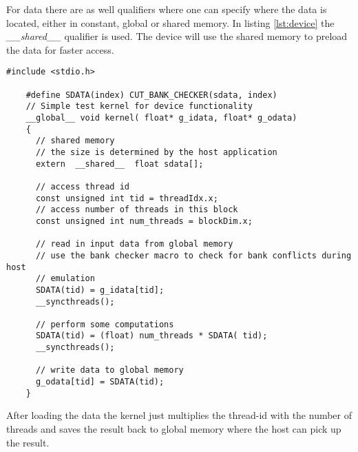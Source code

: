 For data there are as well qualifiers where one can specify where the data is
located, either in constant, global or shared memory. In listing
\autoref{lst:device} the \textit{\_\_shared\_\_} qualifier is used. The device will
use the shared memory to preload the data for faster access.


\begin{lstlisting}[caption=CUDA device code, label=lst:device]
	#include <stdio.h>

	#define SDATA(index) CUT_BANK_CHECKER(sdata, index)
	// Simple test kernel for device functionality
	__global__ void kernel( float* g_idata, float* g_odata) 
	{
	  // shared memory
	  // the size is determined by the host application
	  extern  __shared__  float sdata[];

	  // access thread id
	  const unsigned int tid = threadIdx.x;
	  // access number of threads in this block
	  const unsigned int num_threads = blockDim.x;

	  // read in input data from global memory
	  // use the bank checker macro to check for bank conflicts during host
	  // emulation
	  SDATA(tid) = g_idata[tid];
	  __syncthreads();

	  // perform some computations
	  SDATA(tid) = (float) num_threads * SDATA( tid);
	  __syncthreads();

	  // write data to global memory
	  g_odata[tid] = SDATA(tid);
	}

\end{lstlisting}


After loading the data the kernel just multiplies the thread-id with the number
of threads and saves the result back to global memory where the host can pick up
the result.


